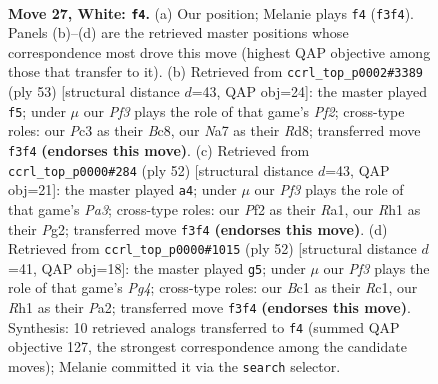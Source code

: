 \documentclass[11pt]{article}
\begin{document}
\clearpage

\begin{figure}[p]\centering
\begin{subfigure}{0.46\textwidth}\centering
\resizebox{\linewidth}{!}{%
\newchessgame
\chessboard[
  setfen={4k3/Nppnpr1p/6p1/p7/7P/2P2P2/P1n1KP2/2B4R w - - 7 27},
  showmover=false,
  pgfstyle=straightmove, color=movearrow, markmove={f3-f4}
]}
\caption{}
\end{subfigure}\hfill
\begin{subfigure}{0.46\textwidth}\centering
\resizebox{\linewidth}{!}{%
\newchessgame
\chessboard[
  setfen={2br4/5pk1/2p3p1/P3p2p/N3P3/1P3R2/1KP4P/8 b - - 2 27},
  showmover=false,
  pgfstyle=straightmove, color=movearrow, markmove={f7-f5}
]}
\caption{}
\end{subfigure}
\\[4pt]
\begin{subfigure}{0.46\textwidth}\centering
\resizebox{\linewidth}{!}{%
\newchessgame
\chessboard[
  setfen={5bk1/6pp/p1r1p3/1p2n3/4N3/PP2B3/5PPP/R2K4 w - - 6 27},
  showmover=false,
  pgfstyle=straightmove, color=movearrow, markmove={a3-a4}
]}
\caption{}
\end{subfigure}\hfill
\begin{subfigure}{0.46\textwidth}\centering
\resizebox{\linewidth}{!}{%
\newchessgame
\chessboard[
  setfen={8/p1p3kp/1pP3p1/1P6/3r2P1/6P1/P2n2B1/2R3K1 w - - 0 27},
  showmover=false,
  pgfstyle=straightmove, color=movearrow, markmove={g4-g5}
]}
\caption{}
\end{subfigure}
\caption{\textbf{Move 27, White: \texttt{f4}.} (a) Our position; Melanie plays \texttt{f4} (\texttt{f3f4}). Panels (b)--(d) are the retrieved master positions whose correspondence most drove this move (highest QAP objective among those that transfer to it). (b) Retrieved from \texttt{ccrl\_top\_p0002\#3389} (ply 53) [structural distance $d$=43, QAP obj=24]: the master played \texttt{f5}; under $\mu$ our \emph{Pf3} plays the role of that game's \emph{Pf2}; cross-type roles: our \emph{P}c3 as their \emph{B}c8, our \emph{N}a7 as their \emph{R}d8; transferred move \texttt{f3f4} \textbf{(endorses this move)}. (c) Retrieved from \texttt{ccrl\_top\_p0000\#284} (ply 52) [structural distance $d$=43, QAP obj=21]: the master played \texttt{a4}; under $\mu$ our \emph{Pf3} plays the role of that game's \emph{Pa3}; cross-type roles: our \emph{P}f2 as their \emph{R}a1, our \emph{R}h1 as their \emph{P}g2; transferred move \texttt{f3f4} \textbf{(endorses this move)}. (d) Retrieved from \texttt{ccrl\_top\_p0000\#1015} (ply 52) [structural distance $d$=41, QAP obj=18]: the master played \texttt{g5}; under $\mu$ our \emph{Pf3} plays the role of that game's \emph{Pg4}; cross-type roles: our \emph{B}c1 as their \emph{R}c1, our \emph{R}h1 as their \emph{P}a2; transferred move \texttt{f3f4} \textbf{(endorses this move)}. Synthesis: 10 retrieved analogs transferred to \texttt{f4} (summed QAP objective 127, the strongest correspondence among the candidate moves); Melanie committed it via the \texttt{search} selector.}
\label{fig:thought-m52}
\end{figure}
\end{document}

